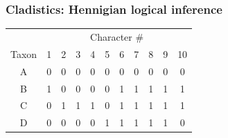 \begin{frame}
    \frametitle{Cladistics: Hennigian logical inference}
\begin{table}[htdp]
\begin{center}
\begin{tabular}{|c|c|c|c|c|c|c|c|c|c|c|}
\hline 
 & \multicolumn{10}{c|}{Character \#} \\ 
Taxon &\color{blue} 1 & \color{blue} 2 & \color{blue} 3 & \color{blue} 4 & \color{blue} 5 & \color{green} 6 & \color{green} 7 & \color{green} 8 & \color{green} 9 & \color{red} 10  \\ 
\hline 
A &    \color{blue} 0 & \color{blue} 0 & \color{blue} 0 & \color{blue} 0 & \color{blue} 0 & \color{green} 0 & \color{green} 0 & \color{green} 0 & \color{green} 0 & \color{red} 0 \\
B &    \color{blue} 1 & \color{blue} 0 & \color{blue} 0 & \color{blue} 0 & \color{blue} 0 & \color{green} 1 & \color{green} 1 & \color{green} 1 & \color{green} 1 & \color{red} 1 \\
C &    \color{blue} 0 & \color{blue} 1 & \color{blue} 1 & \color{blue} 1 & \color{blue} 0 & \color{green} 1 & \color{green} 1 & \color{green} 1 & \color{green} 1 & \color{red} 1 \\
D &    \color{blue} 0 & \color{blue} 0 & \color{blue} 0 & \color{blue} 0 & \color{blue} 1 & \color{green} 1 & \color{green} 1 & \color{green} 1 & \color{green} 1 & \color{red} 0 \\
\hline 
\end{tabular}
\end{center}
\end{table}
\end{frame}

